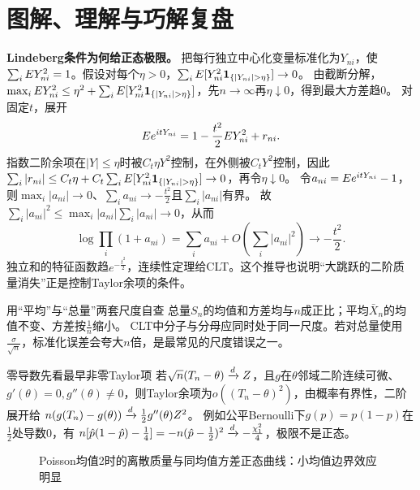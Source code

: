\section*{图解、理解与巧解复盘}
\begin{extension}
\textbf{Lindeberg条件为何给正态极限。}
把每行独立中心化变量标准化为$Y_{ni}$，使$\sum_iE Y_{ni}^2=1$。假设对每个$\eta>0$，$\sum_i\E[Y_{ni}^2\ind_{\{|Y_{ni}|>\eta\}}]\to0$。
由截断分解，$\max_i\E Y_{ni}^2\le\eta^2+\sum_i\E[Y_{ni}^2\ind_{\{|Y_{ni}|>\eta\}}]$，先$n\to\infty$再$\eta\downarrow0$，得到最大方差趋0。
对固定$t$，展开
\[E e^{itY_{ni}}=1-\dfrac{t^2}{2}E Y_{ni}^2+r_{ni}.\]
指数二阶余项在$|Y|\le\eta$时被$C_t\eta Y^2$控制，在外侧被$C_tY^2$控制，因此$\sum_i|r_{ni}|\le C_t\eta+C_t\sum_i\E[Y_{ni}^2\ind_{\{|Y_{ni}|>\eta\}}]\to0$，再令$\eta\downarrow0$。
令$a_{ni}=E e^{itY_{ni}}-1$，则$\max_i|a_{ni}|\to0$、$\sum_i a_{ni}\to-\frac{t^2}{2}$且$\sum_i|a_{ni}|$有界。
故$\sum_i|a_{ni}|^2\le\max_i|a_{ni}|\sum_i|a_{ni}|\to0$，从而
\[\log\prod_i(1+a_{ni})=\sum_i a_{ni}+O\!\left(\sum_i|a_{ni}|^2\right)\to-\dfrac{t^2}{2}.\]
独立和的特征函数趋$e^{-\frac{t^2}{2}}$，连续性定理给CLT。这个推导也说明“大跳跃的二阶质量消失”正是控制Taylor余项的条件。
\end{extension}
\begin{insight}{用“平均”与“总量”两套尺度自查}
总量$S_n$的均值和方差均与$n$成正比；平均$\bar X_n$的均值不变、方差按$\frac{1}{n}$缩小。
CLT中分子与分母应同时处于同一尺度。若对总量使用$\frac{\sigma}{\sqrt n}$，标准化误差会夸大$n$倍，是最常见的尺度错误之一。
\end{insight}
\begin{clevertrick}{零导数先看最早非零Taylor项}
若$\sqrt n(T_n-\theta)\xrightarrow{d} Z$，且$g$在$\theta$邻域二阶连续可微、$g'(\theta)=0,g''(\theta)\ne0$，则Taylor余项为$o((T_n-\theta)^2)$，由概率有界性，二阶展开给
$n(g(T_n)-g(\theta))\xrightarrow{d}\frac12g''(\theta)Z^2$。
例如公平Bernoulli下$g(p)=p(1-p)$在$\frac{1}{2}$处导数0，有
$n[\hat p(1-\hat p)-\frac{1}{4}]=-n(\hat p-\frac{1}{2})^2\xrightarrow{d}-\frac{\chi_1^2}{4}$，极限不是正态。
\end{clevertrick}
\begin{figure}[htbp]\centering
{}\caption{Poisson均值2时的离散质量与同均值方差正态曲线：小均值边界效应明显}\label{fig:poisson-normal}\end{figure}

